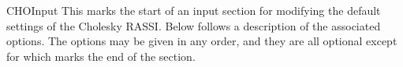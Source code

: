 \begin{keywordlist}
\item[CHOInput]
This marks the start of an input section for modifying
the default settings of the Cholesky RASSI.
Below follows a description of the associated options.
The options may be given in any order,
and they are all optional except for
 which marks the end of the  section.


\end{keywordlist}
